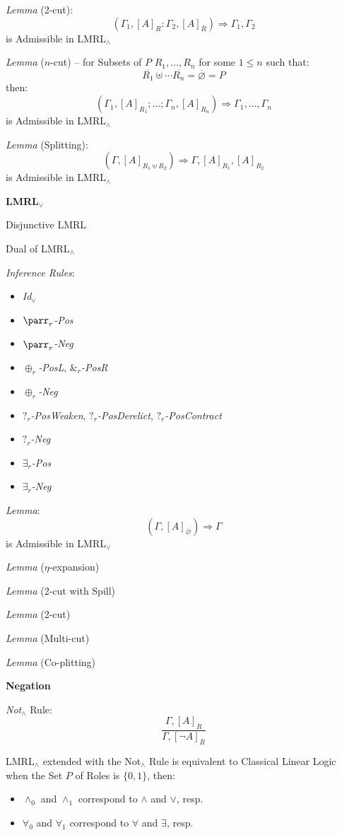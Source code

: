 \emph{Lemma} (2-cut):
\[
  (\Gamma_1, [A]_R : \Gamma_2, [A]_{\overline{R}})
    \Rightarrow \Gamma_1,\Gamma_2
\]
is Admissible in LMRL$_\wedge$

\emph{Lemma} ($n$-cut) -- for Subsets of $P$ $R_1,\ldots,R_n$ for some
$1 \leq n$ such that:
\[
  \overline{R_1} \uplus \cdots \overline{R_n} = \overline{\varnothing}
    = P
\]
then:
\[
  (\Gamma_1,[A]_{R_1}; \ldots; \Gamma_n,[A]_{R_n})
    \Rightarrow \Gamma_1, \ldots, \Gamma_n
\]
is Admissible in LMRL$_\wedge$

\emph{Lemma} (Splitting):
\[
  (\Gamma,[A]_{R_1 \uplus R_2}) \Rightarrow \Gamma,[A]_{R_1},[A]_{R_2}
\]
is Admissible in LMRL$_\wedge$


\textbf{LMRL$_\vee$}

Disjunctive LMRL

Dual of LMRL$_\wedge$

\emph{Inference Rules}:
\begin{itemize}
  \item \emph{Id$_\vee$}
  \item \emph{$\parr_r$-Pos}
  \item \emph{$\parr_r$-Neg}
  \item \emph{$\oplus_r$-PosL}, \emph{$\&_r$-PosR}
  \item \emph{$\oplus_r$-Neg}
  \item \emph{$?_r$-PosWeaken}, \emph{$?_r$-PosDerelict},
    \emph{$?_r$-PosContract}
  \item \emph{$?_r$-Neg}
  \item \emph{$\exists_r$-Pos}
  \item \emph{$\exists_r$-Neg}
\end{itemize}

\emph{Lemma}:
\[
  (\Gamma, [A]_{\overline{\varnothing}}) \Rightarrow \Gamma
\]
is Admissible in LMRL$_\vee$

\emph{Lemma} ($\eta$-expansion)

\emph{Lemma} (2-cut with Spill)

\emph{Lemma} (2-cut)

\emph{Lemma} (Multi-cut)

\emph{Lemma} (Co-plitting)



\textbf{Negation}

\emph{Not$_\wedge$} Rule:
\[
  \frac{
    \Gamma, [A]_R
  }{
    \Gamma, [\neg A]_{\overline{R}}
  }
\]

LMRL$_\wedge$ extended with the Not$_\wedge$ Rule is equivalent to
Classical Linear Logic when the Set $P$ of Roles is $\{0,1\}$, then:
\begin{itemize}
  \item $\wedge_0$ and $\wedge_1$ correspond to $\wedge$ and $\vee$,
    resp.
  \item $\forall_0$ and $\forall_1$ correspond to $\forall$ and
    $\exists$, resp.
\end{itemize}

